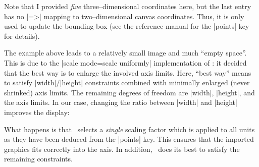 {{\begin{codeexample}[]
\end{codeexample}
\noindent Note that I provided \emph{five} three--dimensional coordinates here, but the last entry has no |=>| mapping to two--dimensional canvas coordinates. Thus, it is only used to update the bounding box (see the reference manual for the |points| key for details).

The example above leads to a relatively small image and much ``empty space''. This is due to the |scale mode=scale uniformly| implementation of \PGFPlots: it decided that the best way is to enlarge the involved axis limits. Here, ``best way'' means to satisfy |width|/|height| constraints combined with minimally enlarged (never shrinked) axis limits. The remaining degrees of freedom are |width|, |height|, and the axis limits. In our case, changing the ratio between |width| and |height| improves the display:

\begin{codeexample}[]
\end{codeexample}
\noindent What happens is that \PGFPlots\ selects a \emph{single} scaling factor which is applied to all units as they have been deduced from the |points| key. This ensures that the imported graphics fits correctly into the axis. In addition, \PGFPlots\ does its best to satisfy the remaining constraints. 

}}

